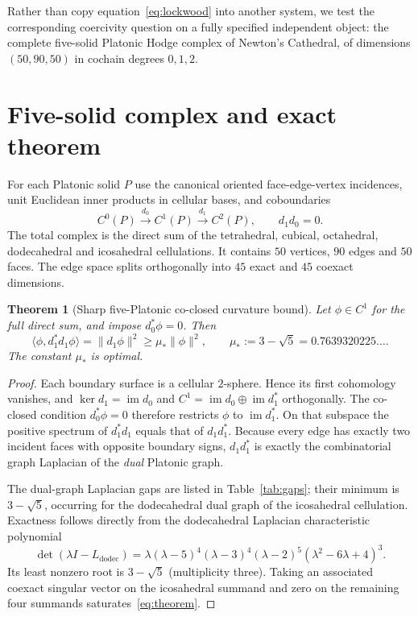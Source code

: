 \documentclass[11pt,a4paper]{article}
\newtheorem{theorem}{Theorem}
\begin{document}
Rather than copy equation~\eqref{eq:lockwood} into another system, we test the corresponding coercivity question on a fully specified independent object: the complete five-solid Platonic Hodge complex of Newton's Cathedral, of dimensions $(50,90,50)$ in cochain degrees $0,1,2$.

\section{Five-solid complex and exact theorem}
For each Platonic solid $P$ use the canonical oriented face-edge-vertex incidences, unit Euclidean inner products in cellular bases, and coboundaries
\[
 C^0(P)\xrightarrow{d_0}C^1(P)\xrightarrow{d_1}C^2(P),
 \qquad d_1d_0=0.
\]
The total complex is the direct sum of the tetrahedral, cubical, octahedral, dodecahedral and icosahedral cellulations. It contains $50$ vertices, $90$ edges and $50$ faces. The edge space splits orthogonally into $45$ exact and $45$ coexact dimensions.

\begin{theorem}[Sharp five-Platonic co-closed curvature bound]\label{thm:gap}
Let $\phi\in C^1$ for the full direct sum, and impose $d_0^{\!*}\phi=0$. Then
\begin{equation}\label{eq:theorem}
 \langle \phi,d_1^{\!*}d_1\phi\rangle
 =\|d_1\phi\|^2\ge \mu_*\|\phi\|^2,
 \qquad \mu_*:=3-\sqrt5=0.7639320225\ldots .
\end{equation}
The constant $\mu_*$ is optimal.
\end{theorem}

\begin{proof}
Each boundary surface is a cellular $2$-sphere. Hence its first cohomology vanishes, and
$\ker d_1=\operatorname{im}d_0$ and $C^1=\operatorname{im}d_0\oplus\operatorname{im}d_1^{\!*}$ orthogonally. The co-closed condition $d_0^{\!*}\phi=0$ therefore restricts $\phi$ to $\operatorname{im}d_1^{\!*}$. On that subspace the positive spectrum of $d_1^{\!*}d_1$ equals that of $d_1d_1^{\!*}$. Because every edge has exactly two incident faces with opposite boundary signs, $d_1d_1^{\!*}$ is exactly the combinatorial graph Laplacian of the \emph{dual} Platonic graph.

The dual-graph Laplacian gaps are listed in Table~\ref{tab:gaps}; their minimum is $3-\sqrt5$, occurring for the dodecahedral dual graph of the icosahedral cellulation. Exactness follows directly from the dodecahedral Laplacian characteristic polynomial
\begin{equation}\label{eq:charpoly}
 \det(\lambda I-L_{\mathrm{dodec}})
 =\lambda(\lambda-5)^4(\lambda-3)^4(\lambda-2)^5
 (\lambda^2-6\lambda+4)^3.
\end{equation}
Its least nonzero root is $3-\sqrt5$ (multiplicity three). Taking an associated coexact singular vector on the icosahedral summand and zero on the remaining four summands saturates~\eqref{eq:theorem}.
\end{proof}
\end{document}
